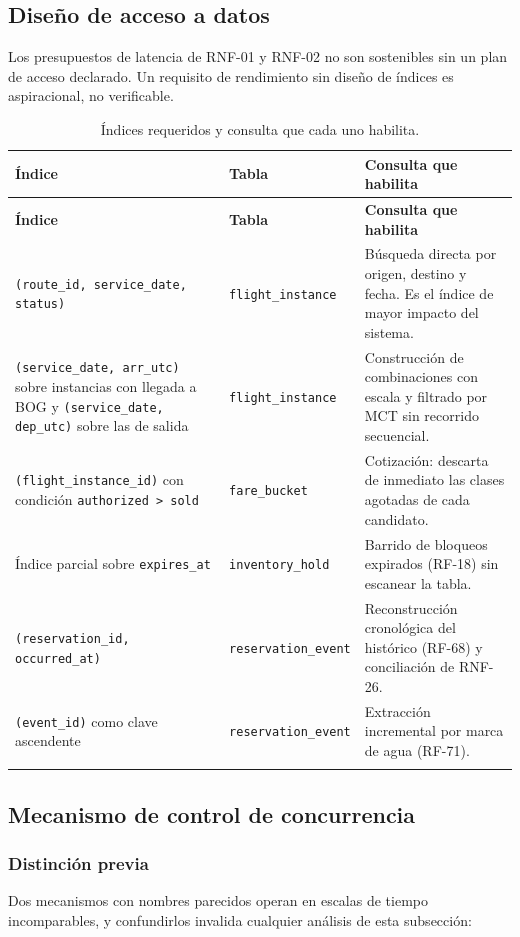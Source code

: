 \documentclass[10pt,letterpaper]{article}
\begin{document}
\subsection{Diseño de acceso a datos}
Los presupuestos de latencia de RNF-01 y RNF-02 no son sostenibles sin un plan de acceso declarado. Un requisito de rendimiento sin diseño de índices es aspiracional, no verificable.

\begin{longtable}{@{}L{5.4cm} L{4.2cm} L{5.6cm}@{}}
\toprule \textbf{Índice} & \textbf{Tabla} & \textbf{Consulta que habilita} \\ \midrule \endfirsthead
\toprule \textbf{Índice} & \textbf{Tabla} & \textbf{Consulta que habilita} \\ \midrule \endhead
\texttt{(route\_id, service\_date, status)} & \texttt{flight\_instance} & Búsqueda directa por origen, destino y fecha. Es el índice de mayor impacto del sistema. \\
\texttt{(service\_date, arr\_utc)} sobre instancias con llegada a BOG y \texttt{(service\_date, dep\_utc)} sobre las de salida & \texttt{flight\_instance} & Construcción de combinaciones con escala y filtrado por MCT sin recorrido secuencial. \\
\texttt{(flight\_instance\_id)} con condición \texttt{authorized > sold} & \texttt{fare\_bucket} & Cotización: descarta de inmediato las clases agotadas de cada candidato. \\
Índice parcial sobre \texttt{expires\_at} & \texttt{inventory\_hold} & Barrido de bloqueos expirados (RF-18) sin escanear la tabla. \\
\texttt{(reservation\_id, occurred\_at)} & \texttt{reservation\_event} & Reconstrucción cronológica del histórico (RF-68) y conciliación de RNF-26. \\
\texttt{(event\_id)} como clave ascendente & \texttt{reservation\_event} & Extracción incremental por marca de agua (RF-71). \\
\bottomrule
\caption{Índices requeridos y consulta que cada uno habilita.}
\end{longtable}

\subsection{Mecanismo de control de concurrencia}

\subsubsection{Distinción previa}
Dos mecanismos con nombres parecidos operan en escalas de tiempo incomparables, y confundirlos invalida cualquier análisis de esta subsección:
\end{document}
